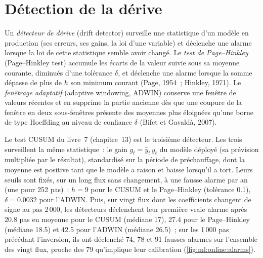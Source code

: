 \section{Détection de la dérive}

\begin{definition}\label{def:ml:online-learning-and-drift:detector}
Un \emph{détecteur de dérive} (drift detector) surveille une statistique d'un modèle en production (ses erreurs, ses gains, la
loi d'une variable) et déclenche une alarme lorsque la loi de cette statistique semble avoir changé. Le
\emph{test de Page--Hinkley} (Page--Hinkley test) accumule les écarts de la valeur suivie sous sa moyenne courante,
diminués d'une tolérance $\delta$, et déclenche une alarme lorsque la somme dépasse de plus de $h$ son minimum courant (Page, 1954~; Hinkley, 1971).
Le \emph{fenêtrage adaptatif} (adaptive windowing, ADWIN) conserve une fenêtre de valeurs récentes et en supprime la partie
ancienne dès que une coupure de la fenêtre en deux sous-fenêtres présente des moyennes plus éloignées qu'une borne de type Hoeffding au niveau de confiance $\delta$
(Bifet et Gavaldà, 2007).
\end{definition}

Le test CUSUM du livre~7 (chapitre~13) est le troisième détecteur. Les trois surveillent la même statistique~: le gain
$g_t = \hat y_t\,y_t$ du modèle déployé (sa prévision multipliée par le résultat), standardisé sur la période de préchauffage, dont la moyenne est positive tant que le
modèle a raison et baisse lorsqu'il a tort. Leurs seuils sont fixés, sur un long flux sans changement, à une fausse alarme
par an (une pour 252 pas)~: $h = 9$ pour le CUSUM et le Page--Hinkley (tolérance 0.1), $\delta = 0.0032$ pour l'ADWIN. Puis, sur vingt
flux dont les coefficients changent de signe au pas 2\,000, les détecteurs déclenchent leur première vraie alarme après 20.8 pas en
moyenne pour le CUSUM (médiane 17), 27.4 pour le Page--Hinkley (médiane 18.5) et 42.5 pour l'ADWIN (médiane 26.5)~; sur les 1\,000 pas
précédant l'inversion, ils ont déclenché 74, 78 et 91 fausses alarmes sur l'ensemble des vingt flux, proche des 79
qu'implique leur calibration (\cref{fig:ml:online:alarms}).

